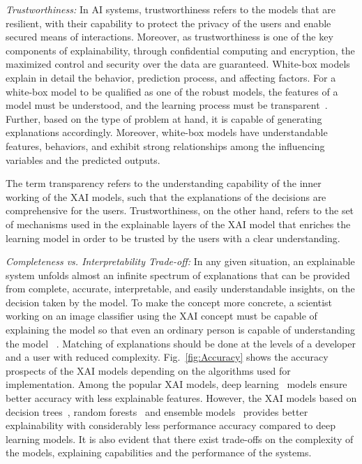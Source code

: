 \documentclass[journal]{IEEEtran}
\begin{document}
\textit{Trustworthiness:} In AI systems, trustworthiness refers to the models that are resilient, with their capability to protect the privacy of the users and enable secured means of interactions. Moreover, as trustworthiness is one of the key components of explainability, through confidential computing and encryption, the maximized control and security over the data are guaranteed. White-box models explain in detail the behavior, prediction process, and affecting factors. For a white-box model to be qualified as one of the robust models, the features of a model must be understood, and the learning process must be transparent~\cite{rawal2021recent}. Further, based on the type of problem at hand, it is capable of generating explanations accordingly. Moreover, white-box models have understandable features, behaviors, and exhibit strong relationships among the influencing variables and the predicted outputs.

The term transparency refers to the understanding capability of the inner working of the XAI models, such that the explanations of the decisions are comprehensive for the users. Trustworthiness, on the other hand, refers to the set of mechanisms used in the explainable layers of the XAI model that enriches the learning model in order to be trusted by the users with a clear understanding.

\textit{Completeness vs. Interpretability Trade-off: } In any given situation, an explainable system unfolds almost an infinite spectrum of explanations that can be provided from complete, accurate, interpretable, and easily understandable insights, on the decision taken by the model. To make the concept more concrete, a scientist working on an image classifier using the XAI concept must be capable of explaining the model so that even an ordinary person is capable of understanding the model ~\cite{van2022explainable}. Matching of explanations should be done at the levels of a developer and a user with reduced complexity. Fig.~\ref{fig:Accuracy} shows the accuracy prospects of the XAI models depending on the algorithms used for implementation. Among the popular XAI models, deep learning~\cite{nascita2021xai} models ensure better accuracy with less explainable features. However, the XAI models based on decision trees~\cite{mahbooba2021explainable}, random forests~\cite{hatwell2020chirps} and ensemble models~\cite{zou2022ensemble} provides better explainability with considerably less performance accuracy compared to deep learning models. It is also evident that there exist trade-offs on the complexity of the models, explaining capabilities and the performance of the systems.
\end{document}
